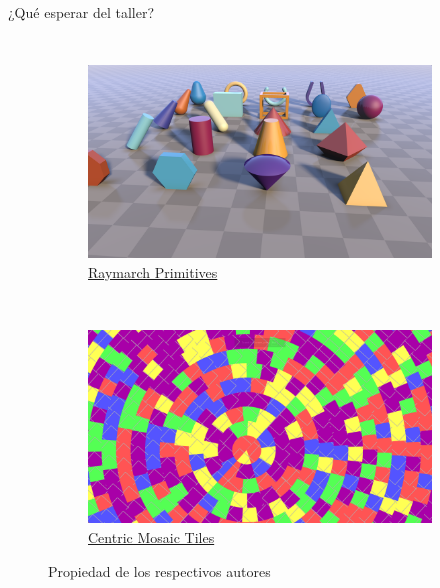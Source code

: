 \begin{frame}{¿Qué esperar del taller?}
\begin{columns}
\begin{figure}[htp]
\begin{subfigure}[b]{0.42\textwidth}
   \includegraphics[width=\textwidth]{img/Raymarching-Primitives}
   \caption{\href{https://www.shadertoy.com/view/Xds3zN}{Raymarch Primitives}}
 \end{subfigure}
~
 \begin{subfigure}[b]{0.42\textwidth}
   \includegraphics[width=\textwidth]{img/AnimatedCentricMosaicTiles}
   \caption{\href{https://www.shadertoy.com/view/43tfRr}{Centric Mosaic Tiles}}
 \end{subfigure}
 \caption{Propiedad de los respectivos autores}
\end{figure}
\end{columns}
\end{frame}


